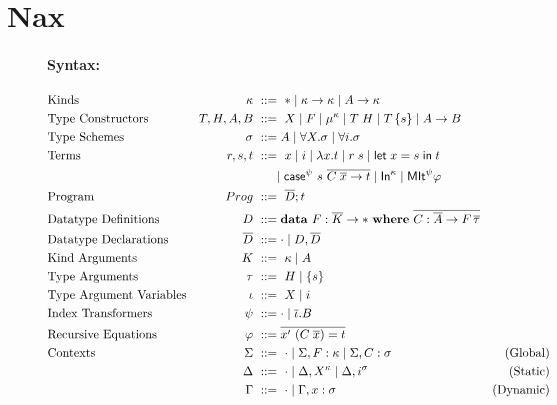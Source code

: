 \section{Nax}\label{sec:nax}
\begin{figure}
\begin{framed}
\paragraph{Syntax:}
\begin{align*}
&\text{Kinds}
	& \kappa	&~ ::= ~ * \mid \kappa -> \kappa \mid A -> \kappa
 \\
&\text{Type Constructors}
	& T,H,A,B	&~ ::= ~ X \mid F
			   \mid \mu^\kappa
			   \mid T\;H \mid T\,\{s\}
			   \mid A -> B
 \\
&\text{Type Schemes}
	& \sigma	&~ ::= A
			   \mid \forall X.\sigma
			   \mid \forall i.\sigma
 \\
&\text{Terms}
	& r,s,t		&~ ::= ~ x \mid i
			   \mid \lambda x.t \mid r\;s \mid \mathsf{let}\;x = s\;\mathsf{in}\; t \\
&	&		&~~~~~
			   \mid \mathsf{case}^\psi~s~\overline{C\;\overline{x} -> t}
			   \mid \mathsf{In}^\kappa
			   \mid \mathsf{MIt}^\psi \varphi 
 \\
&\text{Program}
	& Prog		&~ ::= ~ \overline{D};t
 \\
&\text{Datatype Definitions}
	& D		&~ ::= \mathbf{data}~ F : \overline{K} -> *
                             ~ \mathbf{where} ~
                               \overline{C : \overline{A} -> F\,\overline{\tau}}
 \\
&\text{Datatype Declarations}
	& \overline{D}	&~ ::= \cdot \mid D,\overline{D}
 \\
&\text{Kind Arguments}
	& K		&~ ::= ~ \kappa \mid A
 \\
&\text{Type Arguments}
	& \tau		&~ ::= ~ H \mid \{s\}
 \\
&\text{Type Argument Variables}
	& \iota		&~ ::= ~ X \mid i
 \\
&\text{Index Transformers}
	& \psi		&~ ::= \cdot \mid \overline\iota . B
 \\
&\text{Recursive Equations}
	& \varphi	&~ ::= \overline{x' ~ (C\;\overline{x}) = t}
 \\
&\text{Contexts}
	& \Sigma	&~ ::= ~ \cdot
			   \mid \Sigma, F: \kappa \mid \Sigma, C: \sigma
	& \text{(Global)}
 \\
&	& \Delta	&~ ::= ~ \cdot
			   \mid \Delta, X^\kappa
			   \mid \Delta, i^\sigma
	& \text{(Static)}
 \\
&	& \Gamma	&~ ::= ~ \cdot \mid \Gamma,x:\sigma
	& \text{(Dynamic)}
\end{align*}


\end{framed}
\end{figure}
